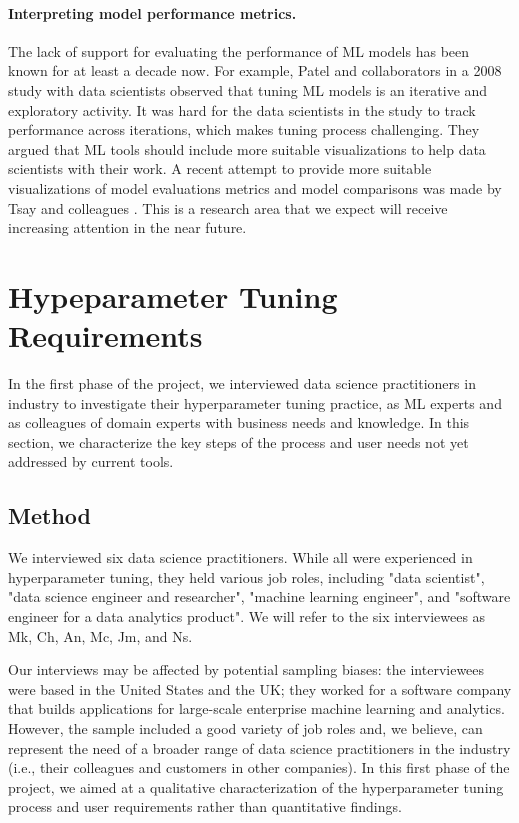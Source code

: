 \documentclass[preprint]{vgtc}        %
\newcommand{\skye}[1]{{ #1}}
\begin{document}
\paragraph{Interpreting model performance metrics.} The lack of support for evaluating the performance of ML models has been known for at least a decade now. For example, Patel and collaborators \cite{Fogarty2008CueFlik} in a 2008 study with data scientists observed that tuning ML models is an iterative and exploratory activity. It was hard for the data scientists in the study to track performance across iterations, which makes tuning process challenging. They argued that ML tools should include more suitable visualizations to help data scientists with their work. A recent attempt to provide more suitable visualizations of model evaluations metrics and model comparisons was made by Tsay and colleagues \cite{TsayRunway:Tool}. This is a research area that we expect will receive increasing attention in the near future.

\section{Hypeparameter Tuning Requirements}
In the first phase of the project, we interviewed data science practitioners in industry to investigate their hyperparameter tuning practice, as ML experts and as colleagues of domain experts with business needs and knowledge. In this section, we characterize the key steps of the process and user needs not yet addressed \skye{by current tools}.

\subsection{Method}
We interviewed six data science practitioners. While all were experienced in hyperparameter tuning, they held various job roles, including "data scientist", "data science engineer and researcher", "machine learning engineer", and "software engineer for a data analytics product". 
We will refer to the six interviewees as Mk, Ch, An, Mc, Jm, and Ns. 

Our interviews may be affected by potential sampling biases: the interviewees were based in the United States and the UK; they worked for a software company that builds applications for large-scale enterprise machine learning and analytics. However, the sample included a good variety of job roles and, we believe, can represent the need of a broader range of data science practitioners in the industry (i.e., their colleagues and customers in other companies). In this first phase of the project, we aimed at a qualitative characterization of the hyperparameter tuning process and user requirements rather than quantitative findings.
\end{document}
